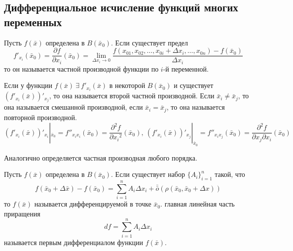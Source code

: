 \subsection{Дифференциальное исчисление функций многих переменных}
\begin{definition}
    Пусть $f(\bar{x})$ определена в $B(\bar{x}_0)$. Если существует предел
    \[f'_{x_i}(\bar{x}_0)=\frac{\partial {f}}{\partial {x_i}}(\bar{x}_0)=\lim\limits_{\Delta x_i\to 0}\frac{f(x_{01}, x_{02}, \dots, x_{0i}+\Delta x_i, \dots, x_{0n})-f(\bar{x}_0)}{\Delta x_i}\]
    то он называется частной производной функции по $i$-й переменной.
\end{definition} 
\begin{definition}
    Если у функции $f(\bar{x})\ \exists\ f'_{x_i}(\bar{x})$ в некоторой $B(\bar{x}_0)$ и существует $(f'_{x_i}(\bar{x}))'_{x_j}$, то она называется второй частной производной. Если $\bar{x}_i\ne \bar{x}_j$, то она называется смешанной производной, если $\bar{x}_i=\bar{x}_j$, то она называется повторной производной.
    \[(f'_{x_i}(\bar{x}))'_{x_i}|_{\bar{x}_0}=f''_{x_i x_i}(\bar{x}_0)=\frac{\partial^2 {f}}{\partial {x_i}^2}(\bar{x}_0),\ (f'_{x_i}(\bar{x}))'_{x_j}|_{\bar{x}_0}=f''_{x_i x_j}(\bar{x}_0)=\frac{\partial^2 {f}}{\partial {x_j}\partial {x_i}}(\bar{x}_0)\]
\end{definition} 
\begin{comm}
    Аналогично определяется частная производная любого порядка.
\end{comm}
\begin{definition}
    Пусть $f(\bar{x})$ определена в $B(\bar{x}_0)$. Если существует набор $\{A_i\}_{i=1}^n$ такой, что
    \[f(\bar{x}_0+\Delta \bar{x})-f(\bar{x}_0)=\sum\limits_{i=1}^{n}A_i \Delta x_i +\bar{\bar{o}}{(\rho(\bar{x}_0, \bar{x}_0+\Delta x))}\]
    то $f(\bar{x})$ называется дифференцируемой в точке $\bar{x}_0$. главная линейная часть приращения 
    \[df=\sum\limits_{i=1}^{n}A_i \Delta x_i\]
    называется первым дифференциалом функции $f(\bar{x})$.
\end{definition} 
